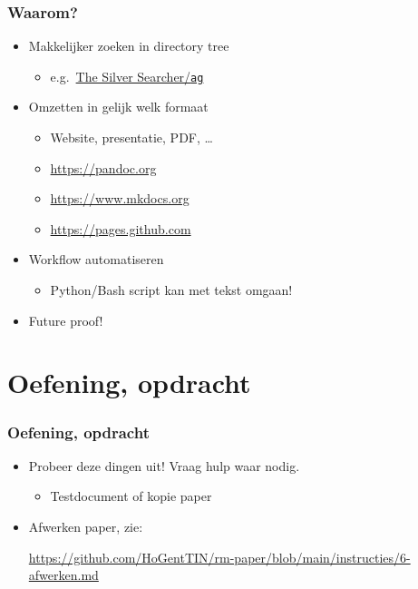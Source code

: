 \documentclass[aspectratio=169]{beamer}
\begin{document}
\begin{frame}
  \frametitle{Waarom?}

  \begin{itemize}
    \item Makkelijker zoeken in directory tree
          \begin{itemize}
            \item e.g.~\href{https://github.com/ggreer/the_silver_searcher}{The Silver Searcher/\texttt{ag}}
          \end{itemize}
    \item Omzetten in gelijk welk formaat
          \begin{itemize}
            \item Website, presentatie, PDF, \ldots
            \item \url{https://pandoc.org}
            \item \url{https://www.mkdocs.org}
            \item \url{https://pages.github.com}
          \end{itemize}
    \item Workflow automatiseren
          \begin{itemize}
            \item Python/Bash script kan met tekst omgaan!
          \end{itemize}
    \item Future proof!
  \end{itemize}

\end{frame}

\section{Oefening, opdracht}

\begin{frame}
  \frametitle{Oefening, opdracht}

  \begin{itemize}
    \item Probeer deze dingen uit! Vraag hulp waar nodig.
          \begin{itemize}
            \item Testdocument of kopie paper
          \end{itemize}
    \item Afwerken paper, zie:

          \url{https://github.com/HoGentTIN/rm-paper/blob/main/instructies/6-afwerken.md}
  \end{itemize}
\end{frame}
\end{document}
